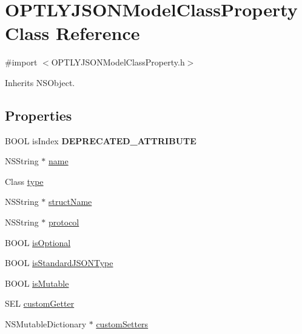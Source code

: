 \hypertarget{interface_o_p_t_l_y_j_s_o_n_model_class_property}{}\section{O\+P\+T\+L\+Y\+J\+S\+O\+N\+Model\+Class\+Property Class Reference}
\label{interface_o_p_t_l_y_j_s_o_n_model_class_property}


{\ttfamily \#import $<$O\+P\+T\+L\+Y\+J\+S\+O\+N\+Model\+Class\+Property.\+h$>$}



Inherits N\+S\+Object.

\subsection*{Properties}
\begin{DoxyCompactItemize}
\item 
\mbox{\label{interface_o_p_t_l_y_j_s_o_n_model_class_property_a41aed5df0bfccf2699ca5fa9f595e3f7}} 
B\+O\+OL is\+Index {\bfseries D\+E\+P\+R\+E\+C\+A\+T\+E\+D\+\_\+\+A\+T\+T\+R\+I\+B\+U\+TE}
\item 
N\+S\+String $\ast$ \mbox{\hyperlink{interface_o_p_t_l_y_j_s_o_n_model_class_property_ae9ce6922e29b9a3347bb2f5f545ced02}{name}}
\item 
Class \mbox{\hyperlink{interface_o_p_t_l_y_j_s_o_n_model_class_property_ad25d121fc33b337fc60f369dab9542ef}{type}}
\item 
N\+S\+String $\ast$ \mbox{\hyperlink{interface_o_p_t_l_y_j_s_o_n_model_class_property_a143680fe163cf0fe3c0588116d79fcfe}{struct\+Name}}
\item 
N\+S\+String $\ast$ \mbox{\hyperlink{interface_o_p_t_l_y_j_s_o_n_model_class_property_a6b90b11220519b683856538f50ffa4f0}{protocol}}
\item 
B\+O\+OL \mbox{\hyperlink{interface_o_p_t_l_y_j_s_o_n_model_class_property_afd88d875bb1ccb5bb25656442109e5ac}{is\+Optional}}
\item 
B\+O\+OL \mbox{\hyperlink{interface_o_p_t_l_y_j_s_o_n_model_class_property_ab003c4b3e614fd74d3a3da6132cb3910}{is\+Standard\+J\+S\+O\+N\+Type}}
\item 
B\+O\+OL \mbox{\hyperlink{interface_o_p_t_l_y_j_s_o_n_model_class_property_a3d9654e4792d75f609bc0cdd8b22faae}{is\+Mutable}}
\item 
S\+EL \mbox{\hyperlink{interface_o_p_t_l_y_j_s_o_n_model_class_property_a300c560be2390b1737bdd6a26f78a6fb}{custom\+Getter}}
\item 
N\+S\+Mutable\+Dictionary $\ast$ \mbox{\hyperlink{interface_o_p_t_l_y_j_s_o_n_model_class_property_ac504f59391bee3944c845cbd322e2661}{custom\+Setters}}
\end{DoxyCompactItemize}


